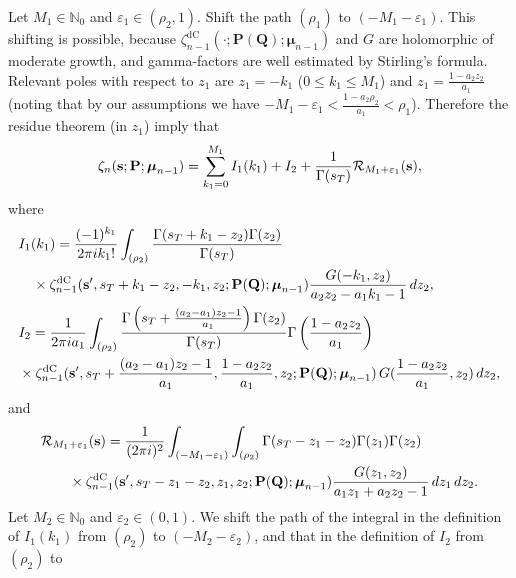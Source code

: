 \documentclass[a4paper,12pt]{article}
\theoremstyle{definition}
\numberwithin{equation}{section}
\def\N{{\mathbb N}}
\def\s{{\bf s}}
\def\P{{\bf P}}
\newcommand{\mub}{\boldsymbol{\mu}}
\newcommand{\dc}{\mathrm{dC}}
\newcommand{\dd}{d}
\newcommand{\ii}{i}
\def\eps{{\varepsilon}}
\begin{document}
Let $M_1 \in \N_0$ and $\eps_1 \in (\rho_2,1)$.
Shift the path $(\rho_1)$ to $(-M_1-\eps_1)$. 
This shifting is possible, because 
$\zeta_{n-1}^{\dc}(\cdot; \mathbf{P(Q)};\boldsymbol{\mu}_{n-1})$ and $G$ are holomorphic of moderate growth, and gamma-factors are well estimated by Stirling's formula.
Relevant poles with respect to $z_1$ are
$z_1=-k_1$ ($0\leq k_1\leq M_1$) and 
$z_1=\frac{1-a_2 z_2}{a_1}$ (noting that by our assumptions we have 
$-M_1-\eps_1<\frac{1-a_2\rho_2}{a_1}<\rho_1$).
Therefore the residue theorem (in $z_1$) imply that 
\begin{align}\label{type12s}
\zeta_n(\s;\P;\mub_{n-1})
=\sum_{k_1=0}^{M_1}I_1(k_1)+I_2+
\frac{1}{\Gamma (s_T)}\mathcal R_{M_1+\eps_1}(\s),
\end{align}
where
\begin{align*}
&I_1(k_1)= \frac{(-1)^{k_1}}{2\pi \ii k_1!} \int_{(\rho_2)}\frac{\Gamma (s_T+k_1-z_2) \Gamma (z_2)}{\Gamma (s_T)} \\
& \quad\times  \zeta_{n-1}^{\dc}(\s', s_T+k_1-z_2, -k_1, z_2; \mathbf{P(Q)};\boldsymbol{\mu}_{n-1}) \frac{G(-k_1, z_2)}{a_2 z_2-a_1 k_1-1}\, \dd z_2,\\
&I_2= \frac{1}{2\pi \ii a_1} \int_{(\rho_2)}\frac{\Gamma \left(s_T+ \frac{(a_2-a_1)z_2-1}{a_1}\right) \Gamma (z_2)}{\Gamma (s_T)} \Gamma\left(\frac{1-a_2z_2}{a_1}\right)\\
& \times \zeta_{n-1}^{\dc}(\s', s_T+ \frac{(a_2-a_1)z_2-1}{a_1}, \frac{1-a_2z_2}{a_1}, z_2; \mathbf{P(Q)};\boldsymbol{\mu}_{n-1}) \, G(\frac{1-a_2z_2}{a_1}, z_2)\, \dd z_2,
\end{align*}
and
\begin{align*}
&\mathcal R_{M_1+\eps_1}(\s) =  \frac{1}{(2\pi \ii)^2} \int_{(-M_1-\eps_1)}\int_{(\rho_2)}\Gamma (s_T-z_1-z_2) \Gamma (z_1) \Gamma (z_2) \\
&\qquad  \times \zeta_{n-1}^{\dc}(\s', s_T-z_1-z_2, z_1, z_2; \mathbf{P(Q)};\boldsymbol{\mu}_{n-1}) \frac{G(z_1, z_2)}{a_1z_1+a_2z_2-1} \, \dd z_1 \, \dd z_2.
\end{align*}
Let $M_2 \in \N_0$ and $\eps_2 \in (0,1)$. We shift the path of the integral
in the definition of $I_1(k_1)$ from $(\rho_2)$ to $(-M_2-\eps_2)$, and that in the definition of $I_2$ from $(\rho_2)$ to  
\end{document}
